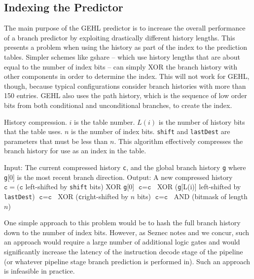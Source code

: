 \subsection{Indexing the Predictor}
\label{sec:indexing}
The main purpose of the GEHL predictor is to increase the overall performance of a branch predictor by exploiting drastically different history lengths.  This presents a problem when using the history as part of the index to the prediction tables.  Simpler schemes like gshare -- which use history lengths that are about equal to the number of index bits -- can simply XOR the branch history with other components in order to determine the index.  This will not work for GEHL, though, because typical configurations consider branch histories with more than 150 entries.  GEHL also uses the path history, which is the sequence of low order bits from both conditional and unconditional branches, to create the index.

\begin{algorithm}[t]
  \newcommand{\g}{\texttt{g}}
  \renewcommand{\c}{\texttt{c}}
  \caption{History compression.  $i$ is the table number.  $L(i)$ is the number of history bits that the table uses. $n$ is the number of index bits. \texttt{shift} and \texttt{lastDest} are parameters that must be less than $n$.  This algorithm effectively compresses the branch history for use as an index in the table.}
  \label{alg:compression}
  \begin{algorithmic}[1]
    \STATE Input: The current compressed history \c, and the global branch history \texttt{g} where \g[0] is the most recent branch direction.
    \STATE Output: A new compressed history
    \STATE
    \STATE $\c = (\c$ left-shifted by \texttt{shift} bits) XOR \g[0]
    \STATE $\c = \c\;$ XOR (\g[L(i)] left-shifted by \texttt{lastDest})
    \STATE $\c = \c\;$ XOR (\c right-shifted by $n$ bits)
    \STATE $\c = \c\;$ AND (bitmask of length $n$)
 \end{algorithmic}
\end{algorithm}

One simple approach to this problem would be to hash the full branch history down to the number of index bits.  However, as Seznec notes\cite{seznec2005analysis}\cite{ogehl} and we concur, such an approach would require a large number of additional logic gates and would significantly increase the latency of the instruction decode stage of the pipeline (or whatever pipeline stage branch prediction is performed in).  Such an approach is infeasible in practice.

